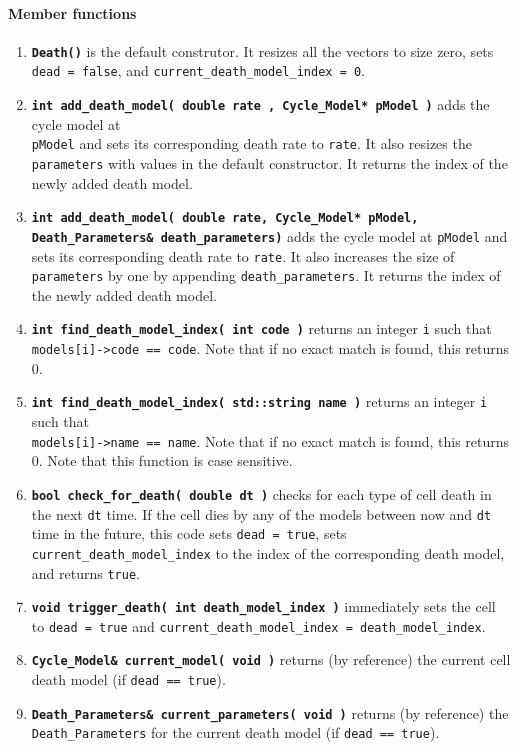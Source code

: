 \documentclass[12pt]{article}
\renewcommand{\v}{\verb}
\newcommand{\smallcode}[1]{\textbf{\texttt{#1}}}
\begin{document}
\paragraph{Member functions}
\begin{enumerate}
\item
\smallcode{Death()} is the default construtor. It resizes all the vectors to size zero, sets 
\v|dead = false|, and \v|current_death_model_index = 0|. 

\item
\smallcode{int add\_death\_model( double rate , Cycle\_Model* pModel )} adds the cycle model 
at \\ \v|pModel| and sets its corresponding death rate to \v|rate|. It also resizes 
the \v|parameters| with values in the default constructor. It returns the 
index of the newly added death model. 

\item 
\smallcode{int add\_death\_model( double rate, Cycle\_Model* pModel, \\
\phantom{int }Death\_Parameters\& death\_parameters)} adds the cycle model 
at \v|pModel| and sets its corresponding death rate to \v|rate|. It also increases the size of  
\v|parameters| by one by appending \v|death_parameters|. It returns the 
index of the newly added death model. 

\item 
\smallcode{int find\_death\_model\_index( int code )} returns an integer \v|i| such that \\
\v|models[i]->code == code|. Note that if no exact match is found, this returns 0.

\item 
\smallcode{int find\_death\_model\_index( std::string name )} returns an integer \v|i| such that \\
\v|models[i]->name == name|. Note that if no exact match is found, this returns 0. 
Note that this function is case sensitive. 

\item 
\smallcode{bool check\_for\_death( double dt )} checks for each type of cell death in the next 
\v|dt| time. If the cell dies by any of the models between now and 
\v|dt| time in the future, this code sets \v|dead = true|, sets \v|current_death_model_index| to the index of 
the corresponding death model, and returns \v|true|. 

\item 
\smallcode{void trigger\_death( int death\_model\_index )} immediately sets the cell to \v|dead = true| 
and \v|current_death_model_index = death_model_index|. 

\item 
\smallcode{Cycle\_Model\& current\_model( void )} returns (by reference) the current cell death model 
(if \hfill\break\v|dead == true|). 

\item 
\smallcode{Death\_Parameters\& current\_parameters( void )} returns (by reference) the \\ \v|Death_Parameters| 
for the current death model (if \v|dead == true|). 
\end{enumerate}
\end{document}
